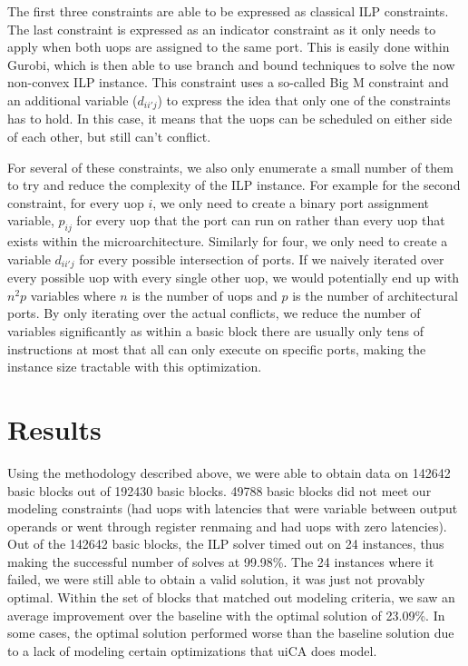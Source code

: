 \documentclass[sigconf]{acmart}
\begin{document}
The first three constraints are able to be expressed as classical ILP constraints. The last constraint is expressed
as an indicator constraint as it only needs to apply when both uops are assigned to the same port. This is easily done
within Gurobi, which is then able to use branch and bound techniques to solve the now non-convex ILP instance. This constraint
uses a so-called Big M constraint and an additional variable ($d_{ii'j}$) to express the idea that only one of the constraints
has to hold. In this case, it means that the uops can be scheduled on either side of each other, but still can't conflict.

For several of these constraints, we also only enumerate a small number of them to try and reduce the complexity of the ILP
instance. For example for the second constraint, for every uop $i$, we only need to create a binary port assignment variable,
$p_{ij}$ for every uop that the port can run on rather than every uop that exists within the microarchitecture. Similarly for
four, we only need to create a variable $d_{ii'j}$ for every possible intersection of ports. If we naively iterated over every
possible uop with every single other uop, we would potentially end up with $n^2p$ variables where $n$ is the number of uops
and $p$ is the number of architectural ports. By only iterating over the actual conflicts, we reduce the number of variables
significantly as within a basic block there are usually only tens of instructions at most that all can only execute on
specific ports, making the instance size tractable with this optimization.

\section{Results}

Using the methodology described above, we were able to obtain data on 142642 basic blocks out of 192430 basic blocks.
49788 basic blocks did not meet our modeling constraints (had uops with latencies that were variable between output
operands or went through register renmaing and had uops with zero latencies). Out of the 142642 basic blocks, the ILP solver
timed out on 24 instances, thus making the successful number of solves at 99.98\%. The 24 instances where it failed, we were
still able to obtain a valid solution, it was just not provably optimal. Within the set of blocks that matched out
modeling criteria, we saw an average improvement over the baseline with the optimal solution of 23.09\%. In some cases,
the optimal solution performed worse than the baseline solution due to a lack of modeling certain optimizations that
uiCA does model.
\end{document}
